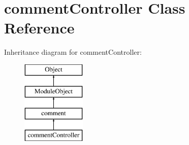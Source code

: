 \hypertarget{classcommentController}{}\section{comment\+Controller Class Reference}
\label{classcommentController}
Inheritance diagram for comment\+Controller\+:\begin{figure}[H]
\begin{center}
\leavevmode
\includegraphics[height=4.000000cm]{classcommentController}
\end{center}
\end{figure}
